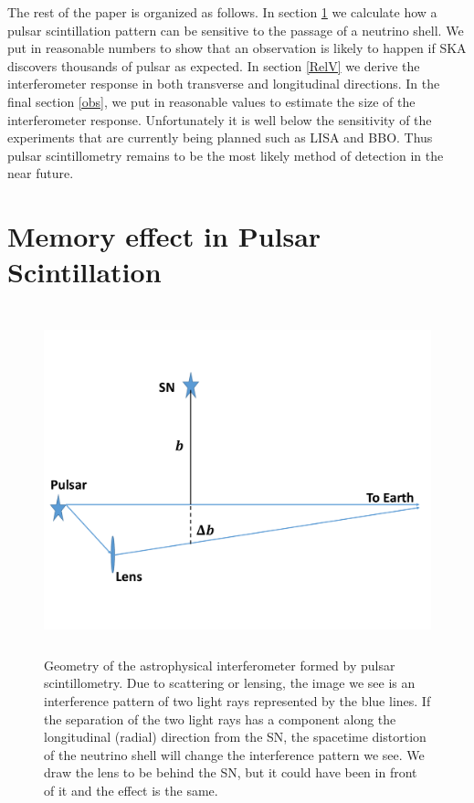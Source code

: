 \documentclass[aps,showpacs,onecolumn,floats,prd,superscriptaddress,nofootinbib]{revtex4-1}
\begin{document}
The rest of the paper is organized as follows. 
In section \ref{sec-scint} we calculate how a pulsar scintillation pattern can be sensitive to the passage of a neutrino shell.
We put in reasonable numbers to show that an observation is likely to happen if SKA discovers thousands of pulsar as expected.
In section \ref{RelV} we derive the interferometer response in both transverse and longitudinal directions.  
In the final section \ref{obs}, we put in reasonable values to estimate the size of the interferometer response.
Unfortunately it is well below the sensitivity of the experiments that are currently being planned such as LISA and BBO.
Thus pulsar scintillometry remains to be the most likely method of detection in the near future.

\section{Memory effect in Pulsar Scintillation}
\label{sec-scint}

\begin{figure}[b!]
\begin{center}
\includegraphics[width=\textwidth,height=10cm]{Lens.pdf}
\caption{Geometry of the astrophysical interferometer formed by pulsar scintillometry. Due to scattering or lensing, the image we see is an interference pattern of two light rays represented by the blue lines. If the separation of the two light rays has a component along the longitudinal (radial) direction from the SN, the spacetime distortion of the neutrino shell will change the interference pattern we see. We draw the lens to be behind the SN, but it could have been in front of it and the effect is the same.}
\label{fig:4}
\end{center}
\end{figure}
\end{document}
